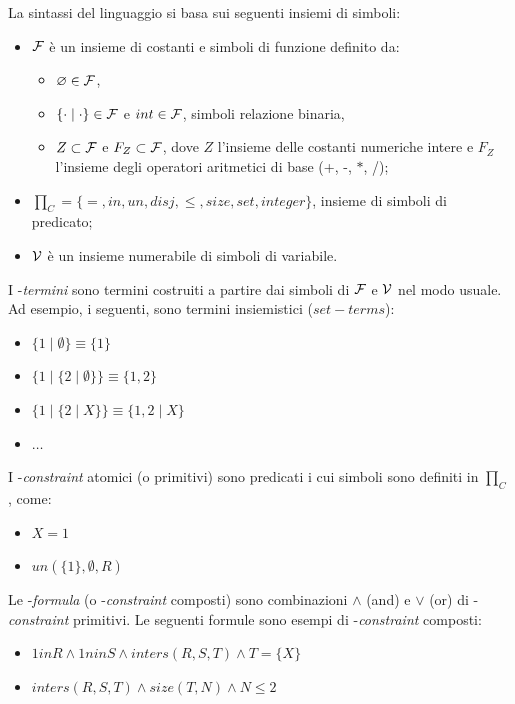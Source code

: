 \documentclass[12pt,a4paper,openright]{book} %
\begin{document}
La sintassi del linguaggio \clpset{} si basa sui seguenti insiemi di simboli:

\begin{itemize}
\item $\mathcal{F}$ è un insieme di costanti e simboli di funzione definito da:    
\begin{itemize}
\item $\varnothing \in \mathcal{F}$,
\item $\{ \cdot \mid \cdot \} \in \mathcal{F}$ e $int \in \mathcal{F}$, simboli relazione binaria,
\item $Z \subset \mathcal{F}$ e $F_Z \subset \mathcal{F}$, dove $Z$ l'insieme delle costanti numeriche intere e $F_Z$ l'insieme degli operatori aritmetici di base (+, -, $\ast$, /);
\end{itemize}
\item $\prod_C = \{ =, in, un, disj, \leq, size, set, integer \}$, insieme di simboli di predicato;
\item $\mathcal{V}$ è un insieme numerabile di simboli di variabile.
\end{itemize}

I \lset{}-\textit{termini} sono termini costruiti a partire dai simboli di $\mathcal{F}$ e $\mathcal{V}$ nel modo usuale. Ad esempio, i seguenti, sono termini insiemistici ($set-terms$):
\begin{itemize}
\item $\{1 \mid \emptyset \} \equiv \{1\}$
\item $\{1 \mid \{2 \mid \emptyset \} \} \equiv \{1,2\}$
\item $\{1 \mid \{2 \mid X \} \} \equiv \{1,2 \mid X \}$
\item $\ldots$
\end{itemize}
    
I \lset{}-\textit{constraint} atomici (o primitivi) sono predicati i cui simboli sono definiti in $\prod_C$, come:
\begin{itemize}
\item $X = 1$
\item $un(\{1\}, \emptyset, R)$
\end{itemize}
    
Le \lset{}-\textit{formula} (o \lset{}-\textit{constraint} composti) sono combinazioni $\wedge$ (and) e $\vee$ (or) di \lset{}-\textit{constraint} primitivi. Le seguenti formule sono esempi di \lset{}-\textit{constraint} composti:
\begin{itemize}
\item $1 in R \land 1 nin S \land inters(R,S,T) \land T = \{X\}$
\item $inters(R, S, T) \land size(T, N) \land N \leq 2$
\end{itemize}
\end{document}
